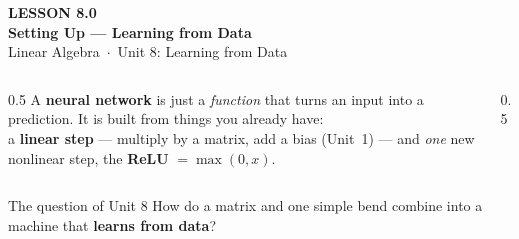 \documentclass[aspectratio=169, 11pt]{beamer}
\newcommand{\relu}{\mathrm{ReLU}}
\begin{document}
{
\begin{frame}[plain]
  \vspace{2.8cm}\hspace{0.55cm}%
  \begin{minipage}{0.9\textwidth}
    {\color{goldacc}\bfseries\small LESSON 8.0}\\[0.5cm]
    {\color{white}\bfseries\LARGE Setting Up --- Learning from Data}\\[1.0cm]
    {\color{blushmid}\small Linear Algebra~$\cdot$~Unit 8: Learning from Data}
  \end{minipage}
\end{frame}
}

\begin{frame}[t, plain]
  \begin{columns}[T]
    \begin{column}{0.5\textwidth}
      A \textbf{neural network} is just a \emph{function} that turns an input into a prediction. It is
      built from things you already have:\\[6pt]
      a \textbf{linear step} --- multiply by a matrix, add a bias (Unit~1) --- and \emph{one} new
      nonlinear step, the \textbf{ReLU} $=\max(0,x)$.
    \end{column}
    \begin{column}{0.5\textwidth}
      \centering
    \end{column}
  \end{columns}
  \vspace{2pt}
  \begin{block}{The question of Unit 8}
    How do a matrix and one simple bend combine into a machine that \textbf{learns from data}?
  \end{block}
\end{frame}
\end{document}
